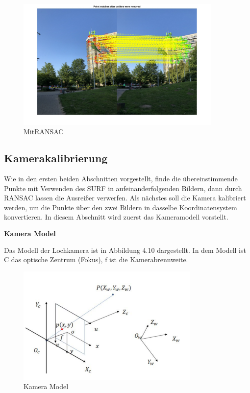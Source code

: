 \begin{figure}[H]
 \centering 
 \includegraphics[keepaspectratio,width=0.9\textwidth]{images/4_ZweiteErfahrung/RANSAC/MitRANSAC.pdf}
 \caption{MitRANSAC}
 \label{fig:MitRANSAC}
\end{figure} 


\subsection{Kamerakalibrierung}

Wie in den ersten beiden Abschnitten vorgestellt, finde die übereinstimmende Punkte mit Verwenden des SURF in aufeinanderfolgenden Bildern, dann durch RANSAC lassen die Ausreißer verwerfen. Als nächstes soll die Kamera kalibriert werden, um die Punkte über den zwei Bildern in dasselbe Koordinatensystem konvertieren. In diesem Abschnitt wird zuerst das Kameramodell vorstellt.

\textbf{Kamera Model}

Das Modell der Lochkamera ist in Abbildung 4.10 dargestellt. In dem Modell ist C das optische Zentrum (Fokus), f ist die Kamerabrennweite.

\begin{figure}[htb]
 \centering 
 \includegraphics[keepaspectratio,width=0.8\textwidth]{images/4_ZweiteErfahrung/Kamera/cameramodel.pdf}
 \caption{Kamera Model}
 \label{fig:cameramodel}
\end{figure} 

